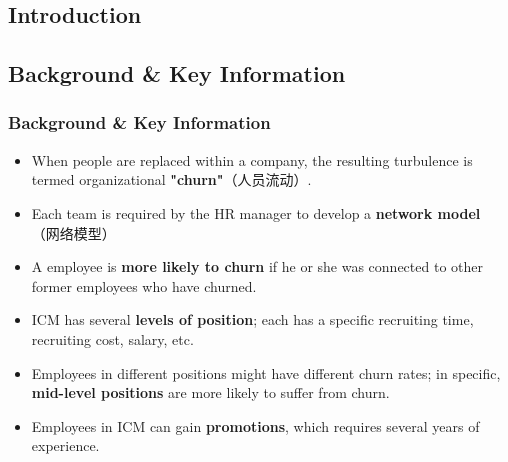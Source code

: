 \documentclass{beamer}
\begin{document}
\begin{CJK*}{UTF8}{gbsn}
\section{Introduction} %

\subsection{Background \& Key Information} %

\begin{frame}
\frametitle{Background \& Key Information}
\begin{itemize}
\item When people are replaced within a company, the resulting turbulence is termed organizational {\bf "churn"}（人员流动）. 
\item Each team is required by the HR manager to develop a {\bf network model} （网络模型）
\item A employee is {\bf more likely to churn} if he or she was connected to other former employees who have churned.
\item ICM has several {\bf levels of position}; each has a specific recruiting time, recruiting cost, salary, etc. 
\item Employees in different positions might have different churn rates; in specific, {\bf mid-level positions} are more likely to suffer from churn.
\item Employees in ICM can gain {\bf promotions}, which requires several years of experience.
\end{itemize}
\end{frame}


\end{CJK*}
\end{document}

